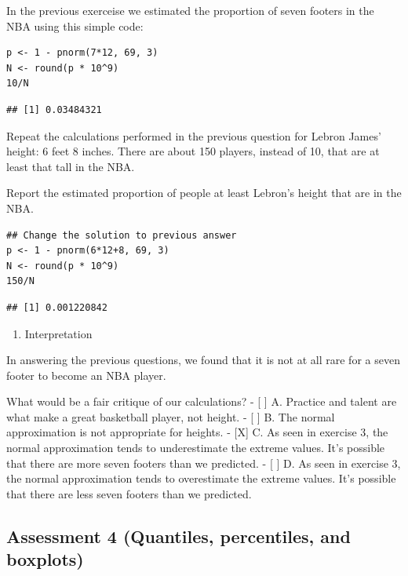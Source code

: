 \documentclass[
]{article}
\providecommand{\tightlist}{%
  \setlength{\itemsep}{0pt}\setlength{\parskip}{0pt}}
\begin{document}
In the previous exerceise we estimated the proportion of seven footers
in the NBA using this simple code:

\begin{verbatim}
p <- 1 - pnorm(7*12, 69, 3)  
N <- round(p * 10^9)  
10/N  
\end{verbatim}

\begin{verbatim}
## [1] 0.03484321
\end{verbatim}

Repeat the calculations performed in the previous question for Lebron
James' height: 6 feet 8 inches. There are about 150 players, instead of
10, that are at least that tall in the NBA.

Report the estimated proportion of people at least Lebron's height that
are in the NBA.

\begin{verbatim}
## Change the solution to previous answer
p <- 1 - pnorm(6*12+8, 69, 3)
N <- round(p * 10^9)
150/N
\end{verbatim}

\begin{verbatim}
## [1] 0.001220842
\end{verbatim}

\begin{enumerate}
\def\labelenumi{\arabic{enumi}.}
\setcounter{enumi}{7}
\tightlist
\item
  Interpretation
\end{enumerate}

In answering the previous questions, we found that it is not at all rare
for a seven footer to become an NBA player.

What would be a fair critique of our calculations? - {[} {]} A. Practice
and talent are what make a great basketball player, not height. - {[}
{]} B. The normal approximation is not appropriate for heights. -
{[}X{]} C. As seen in exercise 3, the normal approximation tends to
underestimate the extreme values. It's possible that there are more
seven footers than we predicted. - {[} {]} D. As seen in exercise 3, the
normal approximation tends to overestimate the extreme values. It's
possible that there are less seven footers than we predicted.

\hypertarget{assessment-4-quantiles-percentiles-and-boxplots}{%
\subsection{Assessment 4 (Quantiles, percentiles, and
boxplots)}\label{assessment-4-quantiles-percentiles-and-boxplots}}
\end{document}

